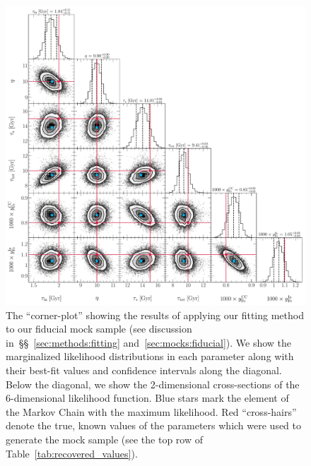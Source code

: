 \documentclass[ms.tex]{subfiles}
\begin{document}
\begin{figure}
\centering
\includegraphics[scale = 0.45]{fiducial_76k8.pdf}
\caption{
The ``corner-plot'' showing the results of applying our fitting method to our
fiducial mock sample (see discussion in~\S\S~\ref{sec:methods:fitting}
and~\ref{sec:mocks:fiducial}).
We show the marginalized likelihood distributions in each parameter along with
their best-fit values and confidence intervals along the diagonal.
Below the diagonal, we show the 2-dimensional cross-sections of the
6-dimensional likelihood function.
Blue stars mark the element of the Markov Chain with the maximum likelihood.
Red ``cross-hairs'' denote the true, known values of the parameters which were
used to generate the mock sample (see the top row of
Table~\ref{tab:recovered_values}).
}
\label{fig:corner_fiducial}
\end{figure}
\end{document}

